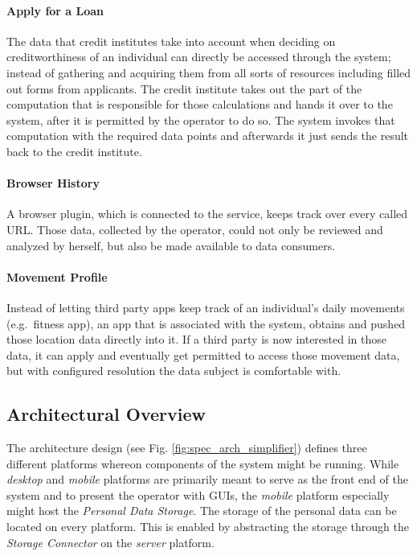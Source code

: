 \documentclass[12pt,english,a4paper,titlepage,cleardoublepage=empty,dottedtoc]{report}
\begin{document}
\paragraph{Apply for a Loan}\label{apply-for-a-loan}

The data that credit institutes take into account when deciding on
creditworthiness of an individual can directly be accessed through the
system; instead of gathering and acquiring them from all sorts of
resources including filled out forms from applicants. The credit
institute takes out the part of the computation that is responsible for
those calculations and hands it over to the system, after it is
permitted by the operator to do so. The system invokes that computation
with the required data points and afterwards it just sends the result
back to the credit institute.

\paragraph{Browser History}\label{browser-history}

A browser plugin, which is connected to the service, keeps track over
every called URL. Those data, collected by the operator, could not only
be reviewed and analyzed by herself, but also be made available to data
consumers.

\paragraph{Movement Profile}\label{movement-profile}

Instead of letting third party apps keep track of an individual's daily
movements (e.g.~fitness app), an app that is associated with the system,
obtains and pushed those location data directly into it. If a third
party is now interested in those data, it can apply and eventually get
permitted to access those movement data, but with configured resolution
the data subject is comfortable with.

\subsection{Architectural Overview}\label{architectural-overview}

The architecture design (see Fig. \ref{fig:spec_arch_simplifier})
defines three different platforms whereon components of the system might
be running. While \emph{desktop} and \emph{mobile} platforms are
primarily meant to serve as the front end of the system and to present
the operator with GUIs, the \emph{mobile} platform especially might host
the \emph{Personal Data Storage}. The storage of the personal data can
be located on every platform. This is enabled by abstracting the storage
through the \emph{Storage Connector} on the \emph{server} platform.
\end{document}
